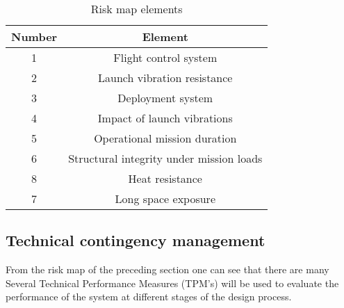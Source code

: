 \begin{table}[h]
\centering
\caption{Risk map elements}
\label{tab:riskelements}
\begin{tabular}{|c|c|}
\hline
\textbf{Number} & \textbf{Element} \\
\hline
1 & Flight control system\\
2 & Launch vibration resistance\\
3 & Deployment system\\
4 & Impact of launch vibrations\\
5 & Operational mission duration\\
6 & Structural integrity under mission loads\\
8 & Heat resistance\\
7 & Long space exposure\\

\hline
\end{tabular}
\end{table}

\subsection{Technical contingency management}
\label{sec:tca}
From the risk map of the preceding section one can see that there are many
Several Technical Performance Measures (TPM's) will be used to evaluate the performance of the system at different stages of the design process. 